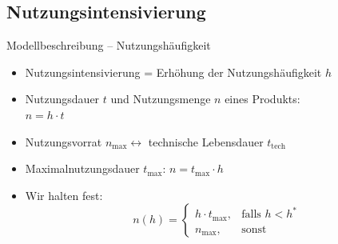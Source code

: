 \documentclass[beamer, xcolor={table,usenames,dvipsnames}]{beamer}
\newcommand{\n}[1]{n_\text{#1}}
\renewcommand{\t}[1]{t_\text{#1}}
\begin{document}
\subsection{Nutzungsintensivierung}
	\frame{\subsectionpage}
	\begin{frame}{Modellbeschreibung -- Nutzungshäufigkeit}
		\begin{itemize}
			\item<1-> Nutzungsintensivierung = Erhöhung der Nutzungshäufigkeit $h$
            \item<2-> Nutzungsdauer $t$ und Nutzungsmenge $n$ eines Produkts: 
                \\ $n = h \cdot t$
            \item<3-> Nutzungsvorrat $\n{max} \leftrightarrow$ technische
                Lebensdauer $\t{tech}$
            \item<4-> Maximalnutzungsdauer $\t{max}$: $n = \t{max} \cdot h$
            \item<8-> Wir halten fest:
                $$n (h) = \left\{\begin{array}{cl}  h \cdot
                    t_{\text{max}}, & \mbox{falls } h < h^* \\ n_{\text{max}}, &
                    \mbox{sonst} \end{array}\right.$$
		\end{itemize}

	\end{frame}
\end{document}

